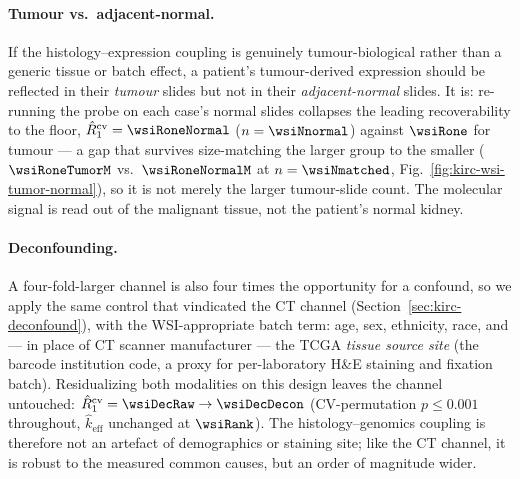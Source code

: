 \documentclass{article}
\begin{document}
\paragraph{Tumour vs.\ adjacent-normal.}
If the histology--expression coupling is genuinely tumour-biological rather than a
generic tissue or batch effect, a patient's tumour-derived expression should be
reflected in their \emph{tumour} slides but not in their \emph{adjacent-normal}
slides. It is: re-running the probe on each case's normal slides collapses the
leading recoverability to the floor, $\hat R_1^{\mathrm{cv}} = \wsiRoneNormal$
($n=\wsiNnormal$) against $\wsiRone$ for tumour --- a gap that survives
size-matching the larger group to the smaller ($\wsiRoneTumorM$ vs.\
$\wsiRoneNormalM$ at $n=\wsiNmatched$, Fig.~\ref{fig:kirc-wsi-tumor-normal}), so
it is not merely the larger tumour-slide count. The molecular signal is read out
of the malignant tissue, not the patient's normal kidney.

\paragraph{Deconfounding.}
A four-fold-larger channel is also four times the opportunity for a confound, so
we apply the same control that vindicated the CT channel
(Section~\ref{sec:kirc-deconfound}), with the WSI-appropriate batch term: age,
sex, ethnicity, race, and --- in place of CT scanner manufacturer --- the TCGA
\emph{tissue source site} (the barcode institution code, a proxy for
per-laboratory H\&E staining and fixation batch). Residualizing both modalities on
this design leaves the channel untouched:
$\hat R_1^{\mathrm{cv}} = \wsiDecRaw \to \wsiDecDecon$
(CV-permutation $p \le 0.001$ throughout, $\hat k_{\mathrm{eff}}$ unchanged at
$\wsiRank$). The histology--genomics coupling is therefore not an artefact of
demographics or staining site; like the CT channel, it is robust to the measured
common causes, but an order of magnitude wider.
\end{document}
